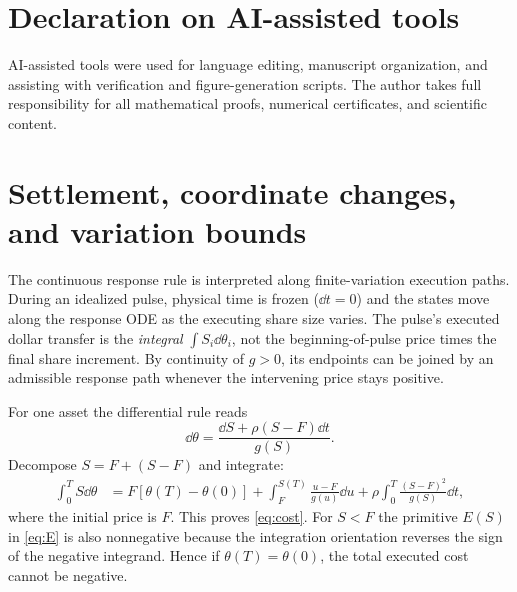 \documentclass[review,hidelinks,onefignum,onetabnum]{siamonline250211}
\begin{document}
\section*{Declaration on AI-assisted tools}
AI-assisted tools were used for language editing, manuscript organization, and assisting with verification and figure-generation scripts. The author takes full responsibility for all mathematical proofs, numerical certificates, and scientific content.

\appendix
\section{Settlement, coordinate changes, and variation bounds}\label{app:accounting}
The continuous response rule is interpreted along finite-variation execution paths. During an idealized pulse, physical time is frozen ($\dd t=0$) and the states move along the response ODE as the executing share size varies. The pulse's executed dollar transfer is the \emph{integral} $\int S_i\dd\theta_i$, not the beginning-of-pulse price times the final share increment. By continuity of $g>0$, its endpoints can be joined by an admissible response path whenever the intervening price stays positive.

For one asset the differential rule reads
\begin{equation}\label{eq:appendix-s}
\dd\theta=\frac{\dd S+\rho(S-F)\dd t}{g(S)}.
\end{equation}
Decompose $S=F+(S-F)$ and integrate:
\begin{align*}
\int_0^T S\dd\theta
&=F[\theta(T)-\theta(0)]
+\int_F^{S(T)}\frac{u-F}{g(u)}\dd u
+\rho\int_0^T\frac{(S-F)^2}{g(S)}\dd t,
\end{align*}
where the initial price is $F$. This proves \eqref{eq:cost}. For $S<F$ the primitive $E(S)$ in \eqref{eq:E} is also nonnegative because the integration orientation reverses the sign of the negative integrand. Hence if $\theta(T)=\theta(0)$, the total executed cost cannot be negative.
\end{document}
